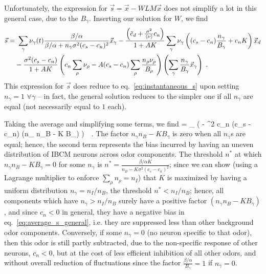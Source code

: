 Unfortunately, the expression for $\vec{s} = \vec{x} - WLM\vec{x}$ does not simplify a lot in this general case, due to the $B_{\gamma}$. Inserting our solution for $W$, we find
\begin{align}
	\vec{s} =& \,\, \sum_{\gamma} \nu_{\gamma}(t) \frac{\beta/\alpha}{\beta/\alpha + n_{\gamma} \sigma^2(c_s - c_n)^2} \vec{x}_{\gamma}
			-\frac{\left(\bar{c}_d + \frac{\sigma^2}{\braket{\nu}} c_n \right)}{1 + AK} \sum_{\gamma}  \nu_{\gamma} \left( (c_s - c_n) \frac{n_{\gamma}}{B_{\gamma}} + c_n K \right) \vec{x}_d	\nonumber \\
			&- \frac{\sigma^2 (c_s - c_n)}{1 + A K} \left( c_n \sum_{\rho} \nu_{\rho} - A(c_s - c_n) \sum_{\rho} \frac{n_{\rho} \nu_{\rho}}{B_{\rho}} \right) \left( \sum_{\gamma} \frac{n_{\gamma}}{B_{\gamma}} \vec{x}_{\gamma} \right) \,\, .
\end{align}
This expression for $\vec{s}$ does reduce to eq.~\eqref{eq:instantaneous_s} upon setting $n_{\gamma} = 1 \,\, \forall \gamma$ -- in fact, the general solution reduces to the simpler one if all $n_{\gamma}$ are equal (not necessarily equal to $1$ each). 

Taking the average and simplifying some terms, we find
\beq
	 = \avgnu \sum_{\gamma}   \left(\frac{\beta}{\alpha} - \sigma^2 c_n (c_s - c_n) (n_{\gamma} n_B - K B_{\gamma}) \right) \,\, .
	\label{eq:average_s_general}
\eeq
The factor $n_{\gamma} n_B - K B_{\gamma}$ is zero when all $n_{\gamma}$s are equal; hence, the second term represents the bias incurred by having an uneven distribution of IBCM neurons across odor components. The threshold $n^*$ at which $n_{\gamma} n_B - K B_{\gamma} = 0$ for some $n_{\gamma}$ is $n^* = \frac{\beta/\alpha K}{n_B - K \sigma^2 (c_s - c_n)^2}$; since we can show (using a Lagrange multiplier to enforce $\sum_\rho n_{\rho} = n_I$) that $K$ is maximized by having a uniform distribution $n_{\gamma} = n_I / n_B$, the threshold $n^* < n_I / n_B$; hence, all components which have $n_{\gamma} > n_I / n_B$ surely have a positive factor $(n_{\gamma} n_B - K B_{\gamma})$, and since $c_n < 0$ in general, they have a negative bias in eq.~\eqref{eq:average_s_general}, i.e. they are suppressed less than other background odor components. Conversely, if some $n_{\gamma} = 0$ (no neuron specific to that odor), then this odor is still partly subtracted, due to the non-specific response of other neurons, $c_n < 0$, but at the cost of less efficient inhibition of all other odors, and without overall reduction of fluctuations since the factor $\frac{\beta/\alpha}{B_{\gamma}} = 1$ if $n_{\gamma} = 0$. 




